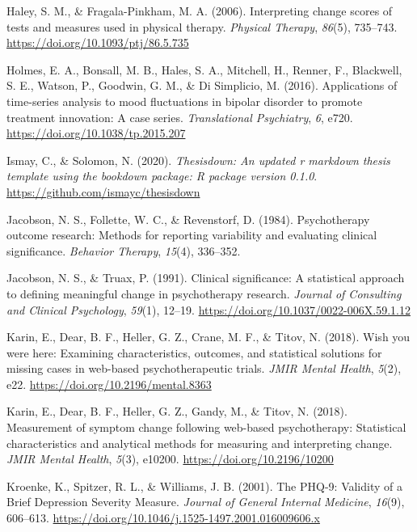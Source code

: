 \documentclass[12pt,twoside]{reedthesis}
\begin{document}
\leavevmode\hypertarget{ref-Haley.2006}{}%
Haley, S. M., \& Fragala-Pinkham, M. A. (2006). Interpreting change scores of tests and measures used in physical therapy. \emph{Physical Therapy}, \emph{86}(5), 735--743. \url{https://doi.org/10.1093/ptj/86.5.735}

\leavevmode\hypertarget{ref-Holmes.2016}{}%
Holmes, E. A., Bonsall, M. B., Hales, S. A., Mitchell, H., Renner, F., Blackwell, S. E., Watson, P., Goodwin, G. M., \& Di Simplicio, M. (2016). Applications of time-series analysis to mood fluctuations in bipolar disorder to promote treatment innovation: A case series. \emph{Translational Psychiatry}, \emph{6}, e720. \url{https://doi.org/10.1038/tp.2015.207}

\leavevmode\hypertarget{ref-Ismay.2020}{}%
Ismay, C., \& Solomon, N. (2020). \emph{Thesisdown: An updated r markdown thesis template using the bookdown package: R package version 0.1.0}. \url{https://github.com/ismayc/thesisdown}

\leavevmode\hypertarget{ref-Jacobson.1984}{}%
Jacobson, N. S., Follette, W. C., \& Revenstorf, D. (1984). Psychotherapy outcome research: Methods for reporting variability and evaluating clinical significance. \emph{Behavior Therapy}, \emph{15}(4), 336--352.

\leavevmode\hypertarget{ref-Jacobson.1991}{}%
Jacobson, N. S., \& Truax, P. (1991). Clinical significance: A statistical approach to defining meaningful change in psychotherapy research. \emph{Journal of Consulting and Clinical Psychology}, \emph{59}(1), 12--19. \url{https://doi.org/10.1037/0022-006X.59.1.12}

\leavevmode\hypertarget{ref-Karin.2018}{}%
Karin, E., Dear, B. F., Heller, G. Z., Crane, M. F., \& Titov, N. (2018). Wish you were here: Examining characteristics, outcomes, and statistical solutions for missing cases in web-based psychotherapeutic trials. \emph{JMIR Mental Health}, \emph{5}(2), e22. \url{https://doi.org/10.2196/mental.8363}

\leavevmode\hypertarget{ref-Karin.2018b}{}%
Karin, E., Dear, B. F., Heller, G. Z., Gandy, M., \& Titov, N. (2018). Measurement of symptom change following web-based psychotherapy: Statistical characteristics and analytical methods for measuring and interpreting change. \emph{JMIR Mental Health}, \emph{5}(3), e10200. \url{https://doi.org/10.2196/10200}

\leavevmode\hypertarget{ref-Kroenke.2001}{}%
Kroenke, K., Spitzer, R. L., \& Williams, J. B. (2001). The PHQ-9: Validity of a Brief Depression Severity Measure. \emph{Journal of General Internal Medicine}, \emph{16}(9), 606--613. \url{https://doi.org/10.1046/j.1525-1497.2001.016009606.x}
\end{document}
